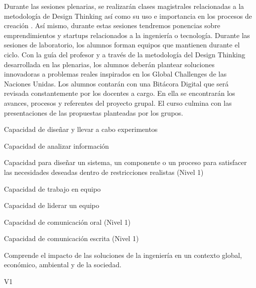 \begin{syllabus}


\begin{justification}
Durante las sesiones plenarias, se realizarán clases magistrales relacionadas a la metodología de Design Thinking así como su uso e importancia en los procesos de creación . Así mismo, durante estas sesiones tendremos ponencias sobre emprendimientos y startups relacionados a la ingeniería o tecnología.
Durante las sesiones de laboratorio, los alumnos forman equipos que mantienen durante el ciclo. Con la guía del profesor y a través de la metodología del Design Thinking desarrollada en las plenarias, los alumnos deberán plantear soluciones innovadoras a problemas reales inspirados en los Global Challenges de las Naciones Unidas.
Los alumnos contarán con una Bitácora Digital que será revisada constantemente por los docentes a cargo. En ella se encontrarán los avances, procesos y referentes del proyecto grupal. El curso culmina con las presentaciones de las propuestas planteadas por los grupos.
\end{justification}

\begin{goals}
\item Capacidad de diseñar y llevar a cabo experimentos 
\item Capacidad de analizar información
\item Capacidad para diseñar un sistema, un componente o un proceso para satisfacer las necesidades deseadas dentro de restricciones realistas (Nivel 1)
\item Capacidad de trabajo en equipo
\item Capacidad de liderar un equipo
\item Capacidad de comunicación oral (Nivel 1)
\item Capacidad de comunicación escrita (Nivel 1)
\item Comprende el impacto de las soluciones de la ingeniería en un contexto global, económico, ambiental y de la sociedad.

\end{goals}

\begin{outcomes}{V1}
    \item {}
    \item {}
\end{outcomes}


\end{syllabus}
